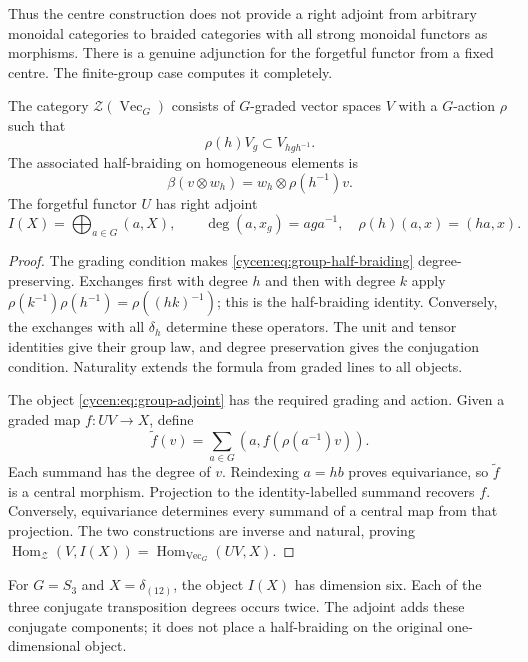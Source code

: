 Thus the centre construction does not provide a right adjoint
from arbitrary monoidal categories to braided categories with
all strong monoidal functors as morphisms. There is a genuine
adjunction for the forgetful functor from a fixed centre.
The finite-group case computes it completely.

\begin{proposition}\label{cycen:prop:group-centre}
The category $\mathcal Z(\operatorname{Vec}_G)$ consists of
$G$-graded vector spaces $V$ with a $G$-action $\rho$ such that
\[
 \rho(h)V_g\subset V_{hgh^{-1}}.
\]
The associated half-braiding on homogeneous elements is
\begin{equation}\label{cycen:eq:group-half-braiding}
 \beta(v\otimes w_h)=w_h\otimes\rho(h^{-1})v.
\end{equation}
The forgetful functor $U$ has right adjoint
\begin{equation}\label{cycen:eq:group-adjoint}
 I(X)=\bigoplus_{a\in G}(a,X),\qquad
 \deg(a,x_g)=aga^{-1},\quad
 \rho(h)(a,x)=(ha,x).
\end{equation}
\end{proposition}
\begin{proof}
The grading condition makes \eqref{cycen:eq:group-half-braiding}
degree-preserving. Exchanges first with degree $h$ and then
with degree $k$ apply
$\rho(k^{-1})\rho(h^{-1})=\rho((hk)^{-1})$; this is the
half-braiding identity. Conversely, the exchanges with all
$\delta_h$ determine these operators. The unit and tensor
identities give their group law, and degree preservation gives
the conjugation condition. Naturality extends the formula
from graded lines to all objects.

The object \eqref{cycen:eq:group-adjoint} has the required
grading and action. Given a graded map $f:UV\to X$, define
\[
 \widetilde f(v)=\sum_{a\in G}
       (a,f(\rho(a^{-1})v)).
\]
Each summand has the degree of $v$. Reindexing $a=hb$
proves equivariance, so $\widetilde f$ is a central morphism.
Projection to the identity-labelled summand recovers $f$.
Conversely, equivariance determines every summand of a central
map from that projection. The two constructions are inverse
and natural, proving
$\operatorname{Hom}_{\mathcal Z}(V,I(X))
 =\operatorname{Hom}_{\operatorname{Vec}_G}(UV,X)$.
\end{proof}

For $G=S_3$ and $X=\delta_{(12)}$, the object $I(X)$ has
dimension six. Each of the three conjugate transposition
degrees occurs twice. The adjoint adds these conjugate
components; it does not place a half-braiding on the original
one-dimensional object.

